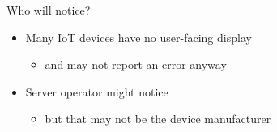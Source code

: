 \documentclass[10pt]{beamer}
\begin{document}
\begin{frame}{Who will notice?}

    \begin{itemize}[<+->]
        \item Many IoT devices have no user-facing display
        \begin{itemize}
            \item and may not report an error anyway
        \end{itemize}
        \item Server operator might notice
        \begin{itemize}
            \item but that may not be the device manufacturer
        \end{itemize}
    \end{itemize}

\end{frame}
\end{document}
